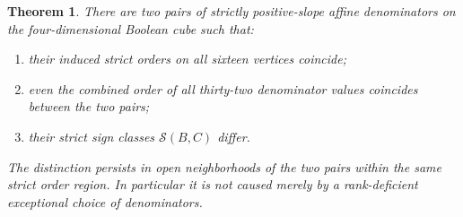\documentclass[11pt]{article}
\newtheorem{theorem}{Theorem}
\begin{document}
\begin{theorem}
There are two pairs of strictly positive-slope affine denominators on
the four-dimensional Boolean cube such that:
\begin{enumerate}
\item their induced strict orders on all sixteen vertices coincide;
\item even the combined order of all thirty-two denominator values
      coincides between the two pairs;
\item their strict sign classes $\mathcal S(B,C)$ differ.
\end{enumerate}
The distinction persists in open neighborhoods of the two pairs within
the same strict order region. In particular it is not caused merely by
a rank-deficient exceptional choice of denominators.
\end{theorem}
\end{document}
